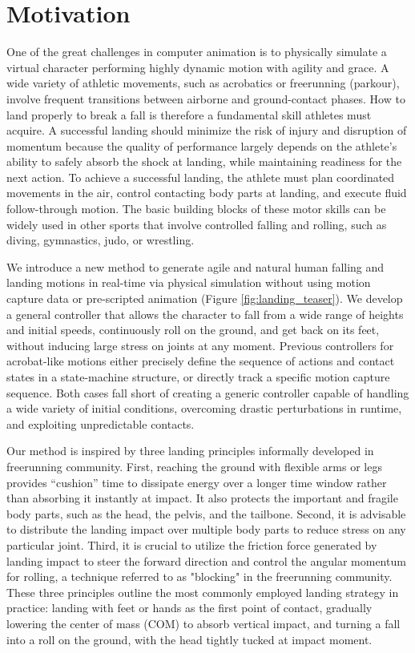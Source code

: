\section{Motivation}
One of the great challenges in computer animation is to physically
simulate a virtual character performing highly dynamic motion with
agility and grace. A wide variety of athletic movements, such as
acrobatics or freerunning (parkour), involve frequent transitions
between airborne and ground-contact phases. How to land properly to
break a fall is therefore a fundamental skill athletes must acquire. A
successful landing should minimize the risk of injury and disruption
of momentum because the quality of performance largely depends on the
athlete's ability to safely absorb the shock at landing, while
maintaining readiness for the next action. To achieve a successful
landing, the athlete must plan coordinated movements in the air,
control contacting body parts at landing, and execute fluid
follow-through motion. The basic building blocks of these motor skills
can be widely used in other sports that involve controlled falling and
rolling, such as diving, gymnastics, judo, or wrestling.

We introduce a new method to generate agile and natural human
falling and landing motions in real-time via physical simulation
without using motion capture data or pre-scripted animation (Figure
\ref{fig:landing_teaser}). We develop a general controller that allows the
character to fall from a wide range of heights and initial speeds,
continuously roll on the ground, and get back on its feet, without
inducing large stress on joints at any moment. Previous controllers
for acrobat-like motions either precisely define the sequence of
actions and contact states in a state-machine structure, or directly
track a specific motion capture sequence. Both cases fall short of
creating a generic controller capable of handling a wide variety of
initial conditions, overcoming drastic perturbations in runtime, and
exploiting unpredictable contacts.

Our method is inspired by three landing principles informally
developed in freerunning community. First, reaching the ground with
flexible arms or legs provides “cushion” time to dissipate energy over
a longer time window rather than absorbing it instantly at impact. It
also protects the important and fragile body parts, such as the head,
the pelvis, and the tailbone. Second, it is advisable to distribute
the landing impact over multiple body parts to reduce stress on any
particular joint. Third, it is crucial to utilize the friction force
generated by landing impact to steer the forward direction and control
the angular momentum for rolling, a technique referred to as
"blocking" in the freerunning community. These three principles
outline the most commonly employed landing strategy in practice:
landing with feet or hands as the first point of contact, gradually
lowering the center of mass (COM) to absorb vertical impact, and
turning a fall into a roll on the ground, with the head tightly tucked
at impact moment.

